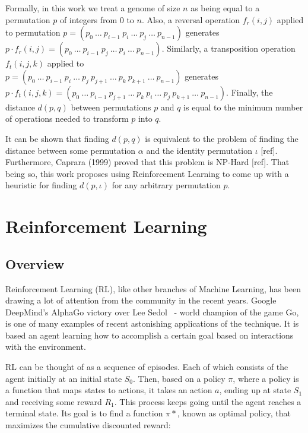 \documentclass[11pt,twoside]{article}
\begin{document}
Formally, in this work we treat a genome of size $n$ as being equal to a permutation $p$ of integers from $0$ to $n$. Also, a reversal operation $f_r(i,j)$ applied to permutation $p = (p_0\ \ldots\ p_{i-1}\ p_{i}\ \ldots\ p_{j}\ \ldots\ p_{n-1})$ generates $p \cdot f_r(i,j) = (p_0\ \ldots\ p_{i-1}\ p_{j}\ \ldots\ p_{i}\ \ldots\ p_{n-1})$. Similarly, a transposition operation $f_t(i,j,k)$ applied to\\ $p = (p_0\ \ldots\ p_{i-1}\ p_{i}\ \ldots\ p_{j}\ p_{j+1}\ \ldots\ p_{k}\ p_{k+1}\ \ldots\ p_{n-1})$ generates\\ $p \cdot f_t(i,j,k) = (p_0\ \ldots\ p_{i-1}\ p_{j+1}\ \ldots\ p_{k}\ p_{i}\ \ldots\ p_{j}\ p_{k+1}\ \ldots\ p_{n-1})$. Finally, the distance $d(p, q)$ between permutations $p$ and $q$ is equal to the minimum number of operations needed to transform $p$ into $q$.

It can be shown that finding $d(p, q)$ is equivalent to the problem of finding the distance between some permutation $\alpha$ and the identity permutation $\iota$ [ref]. Furthermore, Caprara (1999) proved that this problem is NP-Hard [ref]. That being so, this work proposes using Reinforcement Learning to come up with a heuristic for finding $d(p, \iota)$ for any arbitrary permutation $p$.

\section{Reinforcement Learning}


\subsection{Overview}

Reinforcement Learning (RL), like other branches of Machine Learning, has been drawing a lot of attention from the community in the recent years. Google DeepMind's AlphaGo victory over Lee Sedol~\cite{googlelee} - world champion of the game Go, is one of many examples of recent astonishing applications of the technique. It is based an agent learning how to accomplish a certain goal based on interactions with the environment.

RL can be thought of as a sequence of episodes. Each of which consists of the agent initially at an initial state $S_0$. Then, based on a policy $\pi$, where a policy is a function that maps states to actions, it takes an action $a$, ending up at state $S_1$ and receiving some reward $R_1$. This process keeps going until the agent reaches a terminal state. Its goal is to find a function $\pi*$, known as optimal policy, that maximizes the cumulative discounted reward:
\end{document}
